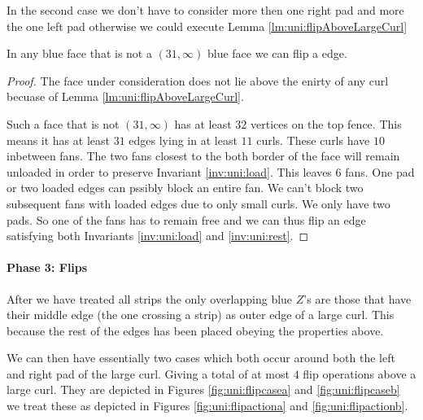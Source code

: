 In the second case we don't have to consider more then one right pad and more the one left pad otherwise we could execute Lemma \ref{lm:uni:flipAboveLargeCurl}

\begin{lemma}
  \label{lm:}
  In any blue face that is not a $(31, \infty)$ blue face  we can flip a edge.
\end{lemma}
\begin{proof}
  The face under consideration does not lie above the enirty of any curl becuase of Lemma \ref{lm:uni:flipAboveLargeCurl}.

  Such a face that is not $(31, \infty)$ has at least $32$ vertices on the top fence. This means it has at least $31$ edges lying in at least $11$ curls. These curls have $10$ inbetween fans. The two fans  closest to the both border of the face will remain unloaded in order to preserve Invariant \ref{inv:uni:load}. This leaves $6$ fans. One pad or two loaded edges can pssibly block an entire fan. We can't block two subsequent fans with loaded edges due to only small curls. We only have two pads. So one of the fans has to remain free and we can thus flip an edge satisfying both Invariants \ref{inv:uni:load} and \ref{inv:uni:rest}.
\end{proof}


\paragraph{Phase 3: Flips}
After we have treated all strips the only overlapping blue $Z$'s are those that have their middle  edge (the one crossing a strip) as outer edge of a large curl. This because the rest of the edges has been placed obeying the properties above.




We can then have essentially two cases which both occur around  both the left and right pad of the large curl. Giving  a total of at most $4$ flip operations above a large curl.
They are depicted in Figures \ref{fig:uni:flipcasea} and \ref{fig:uni:flipcaseb} we treat these as depicted in Figures \ref{fig:uni:flipactiona} and \ref{fig:uni:flipactionb}.


